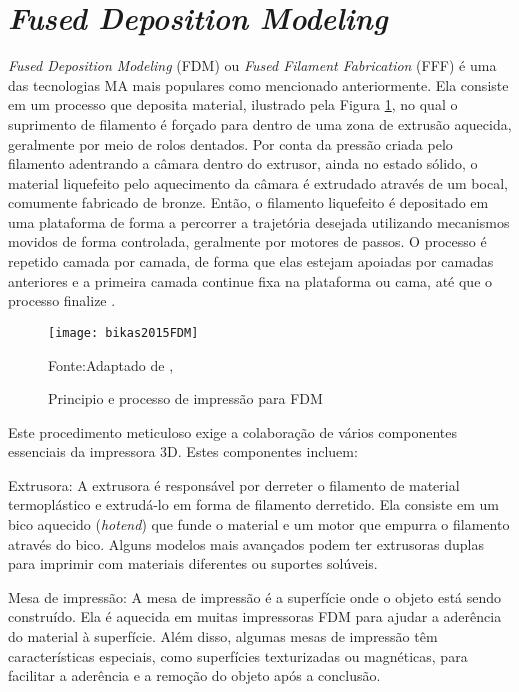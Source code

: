 \section{\textit{Fused Deposition Modeling}}
\textit{Fused Deposition Modeling} (FDM) ou \textit{Fused Filament Fabrication} (FFF) é uma das tecnologias MA mais populares como mencionado anteriormente. Ela consiste em um processo que deposita material, ilustrado pela Figura \ref{fig:fdm_ex}, no qual o suprimento de filamento é forçado para dentro de uma zona de extrusão aquecida, geralmente por meio de rolos dentados. Por conta da pressão criada pelo filamento adentrando a câmara dentro do extrusor, ainda no estado sólido, o material liquefeito pelo aquecimento da câmara é extrudado através de um bocal, comumente fabricado de bronze. Então, o filamento liquefeito é depositado em uma plataforma de forma a percorrer a trajetória desejada utilizando mecanismos movidos de forma controlada, geralmente por motores de passos. O processo é repetido camada por camada, de forma que elas estejam apoiadas por camadas anteriores e a primeira camada continue fixa na plataforma ou cama, até que o processo finalize \cite{turner14}.

\begin{figure}[H]
    \begin{center}
    \caption{Principio e processo de impressão para FDM}
    \texttt{[image: bikas2015FDM]}

    {\footnotesize Fonte:Adaptado de \citeauthor{bikas16}, \citeyear{bikas16}}
    \label{fig:fdm_ex}
    \end{center}
\end{figure}

Este procedimento meticuloso exige a colaboração de vários componentes essenciais da impressora 3D. Estes componentes incluem:

Extrusora: A extrusora é responsável por derreter o filamento de material termoplástico e extrudá-lo em forma de filamento derretido. Ela consiste em um bico aquecido (\textit{hotend}) que funde o material e um motor que empurra o filamento através do bico. Alguns modelos mais avançados podem ter extrusoras duplas para imprimir com materiais diferentes ou suportes solúveis.

Mesa de impressão: A mesa de impressão é a superfície onde o objeto está sendo construído. Ela é aquecida em muitas impressoras FDM para ajudar a aderência do material à superfície. Além disso, algumas mesas de impressão têm características especiais, como superfícies texturizadas ou magnéticas, para facilitar a aderência e a remoção do objeto após a conclusão.

